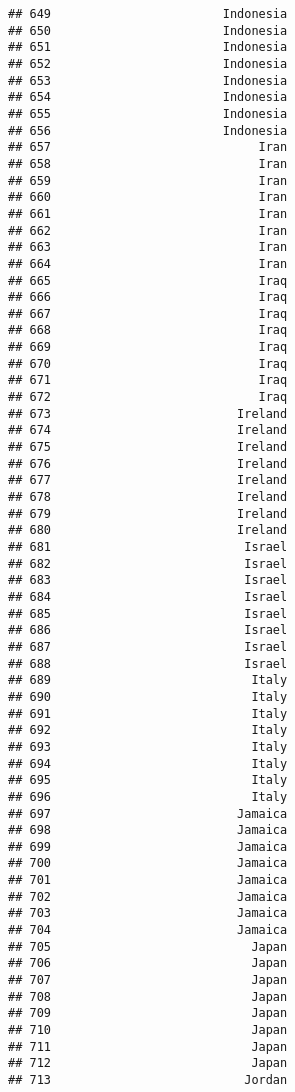 \documentclass[]{article}
\begin{document}
\begin{verbatim}
## 649                        Indonesia
## 650                        Indonesia
## 651                        Indonesia
## 652                        Indonesia
## 653                        Indonesia
## 654                        Indonesia
## 655                        Indonesia
## 656                        Indonesia
## 657                             Iran
## 658                             Iran
## 659                             Iran
## 660                             Iran
## 661                             Iran
## 662                             Iran
## 663                             Iran
## 664                             Iran
## 665                             Iraq
## 666                             Iraq
## 667                             Iraq
## 668                             Iraq
## 669                             Iraq
## 670                             Iraq
## 671                             Iraq
## 672                             Iraq
## 673                          Ireland
## 674                          Ireland
## 675                          Ireland
## 676                          Ireland
## 677                          Ireland
## 678                          Ireland
## 679                          Ireland
## 680                          Ireland
## 681                           Israel
## 682                           Israel
## 683                           Israel
## 684                           Israel
## 685                           Israel
## 686                           Israel
## 687                           Israel
## 688                           Israel
## 689                            Italy
## 690                            Italy
## 691                            Italy
## 692                            Italy
## 693                            Italy
## 694                            Italy
## 695                            Italy
## 696                            Italy
## 697                          Jamaica
## 698                          Jamaica
## 699                          Jamaica
## 700                          Jamaica
## 701                          Jamaica
## 702                          Jamaica
## 703                          Jamaica
## 704                          Jamaica
## 705                            Japan
## 706                            Japan
## 707                            Japan
## 708                            Japan
## 709                            Japan
## 710                            Japan
## 711                            Japan
## 712                            Japan
## 713                           Jordan

\end{verbatim}
\end{document}
